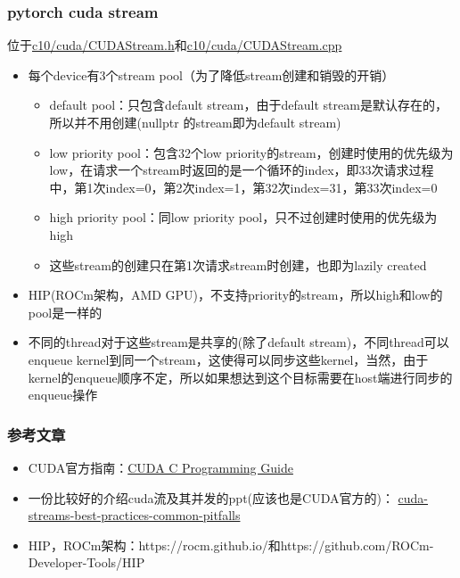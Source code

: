 \hypertarget{pytorch-cuda-stream}{%
\subsubsection{pytorch cuda stream}\label{pytorch-cuda-stream}}

位于\href{https://github.com/pytorch/pytorch/blob/master/c10/cuda/CUDAStream.h}{c10/cuda/CUDAStream.h}和\href{https://github.com/pytorch/pytorch/blob/master/c10/cuda/CUDAStream.cpp}{c10/cuda/CUDAStream.cpp}

\begin{itemize}
\tightlist
\item
  每个device有3个stream pool（为了降低stream创建和销毁的开销）

  \begin{itemize}
  \tightlist
  \item
    default pool：只包含default stream，由于default
    stream是默认存在的，所以并不用创建(nullptr 的stream即为default
    stream)
  \item
    low priority pool：包含32个low
    priority的stream，创建时使用的优先级为low，在请求一个stream时返回的是一个循环的index，即33次请求过程中，第1次index=0，第2次index=1，第32次index=31，第33次index=0
  \item
    high priority pool：同low priority
    pool，只不过创建时使用的优先级为high
  \item
    这些stream的创建只在第1次请求stream时创建，也即为lazily created
  \end{itemize}
\item
  HIP(ROCm架构，AMD
  GPU)，不支持priority的stream，所以high和low的pool是一样的
\item
  不同的thread对于这些stream是共享的(除了default
  stream)，不同thread可以enqueue
  kernel到同一个stream，这使得可以同步这些kernel，当然，由于kernel的enqueue顺序不定，所以如果想达到这个目标需要在host端进行同步的enqueue操作
\end{itemize}

\subsubsection{参考文章}

\begin{itemize}
\tightlist
\item
  CUDA官方指南：\href{https://docs.nvidia.com/cuda/cuda-c-programming-guide/index.html\#abstract}{CUDA
  C Programming Guide}
\item
  一份比较好的介绍cuda流及其并发的ppt(应该也是CUDA官方的)：
  \href{http://on-demand.gputechconf.com/gtc/2014/presentations/S4158-cuda-streams-best-practices-common-pitfalls.pdf}{cuda-streams-best-practices-common-pitfalls}
\item
  HIP，ROCm架构：https://rocm.github.io/和https://github.com/ROCm-Developer-Tools/HIP
\end{itemize}

